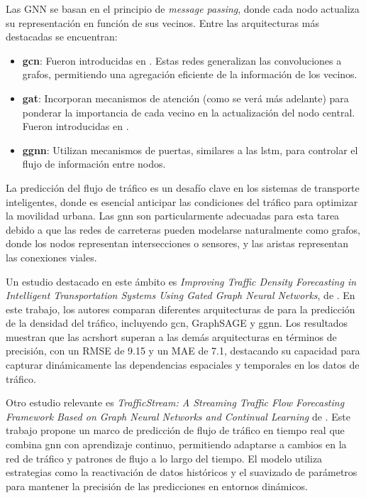 Las GNN se basan en el principio de \textit{message passing}, donde cada nodo actualiza su representación en función de sus vecinos. Entre las arquitecturas más destacadas se encuentran:​

\begin{itemize}
	\item \textbf{\acrlong{gcn}}: Fueron introducidas en \cite{theoryGcn}. Estas redes generalizan las convoluciones a grafos, permitiendo una agregación eficiente de la información de los vecinos.
	\item \textbf{\acrlong{gat}}: Incorporan mecanismos de atención (como se verá más adelante) para ponderar la importancia de cada vecino en la actualización del nodo central. Fueron introducidas en \cite{theoryGan}.
	\item \textbf{\acrlong{ggnn}}: Utilizan mecanismos de puertas, similares a las \acrshort{lstm}, para controlar el flujo de información entre nodos.
\end{itemize}

La predicción del flujo de tráfico es un desafío clave en los sistemas de transporte inteligentes, donde es esencial anticipar las condiciones del tráfico para optimizar la movilidad urbana. Las \acrshort{gnn} son particularmente adecuadas para esta tarea debido a que las redes de carreteras pueden modelarse naturalmente como grafos, donde los nodos representan intersecciones o sensores, y las aristas representan las conexiones viales.

Un estudio destacado en este ámbito es \textit{Improving Traffic Density Forecasting in Intelligent Transportation Systems Using Gated Graph Neural Networks}, de \cite{forecastGgnn}. En este trabajo, los autores comparan diferentes arquitecturas de \cite{gnn} para la predicción de la densidad del tráfico, incluyendo \acrshort{gcn}, GraphSAGE y \acrshort{ggnn}. Los resultados muestran que las acrshort superan a las demás arquitecturas en términos de precisión, con un RMSE de 9.15 y un MAE de 7.1, destacando su capacidad para capturar dinámicamente las dependencias espaciales y temporales en los datos de tráfico.​

Otro estudio relevante es \textit{TrafficStream: A Streaming Traffic Flow Forecasting Framework Based on Graph Neural Networks and Continual Learning} de \cite{forecastGnn}. Este trabajo propone un marco de predicción de flujo de tráfico en tiempo real que combina \acrshort{gnn} con aprendizaje continuo, permitiendo adaptarse a cambios en la red de tráfico y patrones de flujo a lo largo del tiempo. El modelo utiliza estrategias como la reactivación de datos históricos y el suavizado de parámetros para mantener la precisión de las predicciones en entornos dinámicos.​

